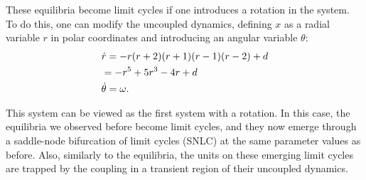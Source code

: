 These equilibria become limit cycles if one introduces a rotation in the system. To do this, one can modify the uncoupled dynamics, defining $x$ as a radial variable $r$ in polar coordinates and introducing an angular variable $\theta$:
\begin{align}
    &\dot{r} = -r(r+2)(r+1)(r-1)(r-2) +d  \\ \notag
    &= -r^5 + 5r^3 - 4r +d \\
    &\dot{\theta} = \omega.
\end{align}

This system can be viewed as the first system with a rotation. In this case, the equilibria we observed before become limit cycles, and they now emerge through a saddle-node bifurcation of limit cycles (SNLC) at the same parameter values as before. Also, similarly to the equilibria, the units on these emerging limit cycles are trapped by the coupling in a transient region of their uncoupled dynamics.
